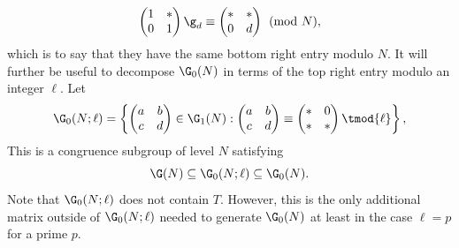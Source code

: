 \documentclass[12pt]{article}
\begin{document}
        \[
          \begin{pmatrix} 1 & \ast \\ 0 & 1 \end{pmatrix}\g_{d} \equiv \begin{pmatrix} \ast & \ast \\ 0 & d \end{pmatrix} \pmod{N},
        \]
        which is to say that they have the same bottom right entry modulo \(N\). It will further be useful to decompose \(\G_{0}(N)\) in terms of the top right entry modulo an integer \(\ell\). Let
        \[
          \G_{0}(N;\ell) = \left\{\begin{pmatrix} a & b \\ c & d \end{pmatrix} \in \G_{1}(N):\begin{pmatrix} a & b \\ c & d \end{pmatrix} \equiv \begin{pmatrix} \ast & 0 \\ \ast & \ast \end{pmatrix} \tmod{\ell}\right\},
        \]
        This is a congruence subgroup of level \(N\) satisfying
        \[
          \G(N) \subseteq \G_{0}(N;\ell) \subseteq \G_{0}(N).
        \]
        Note that \(\G_{0}(N;\ell)\) does not contain \(T\). However, this is the only additional matrix outside of \(\G_{0}(N;\ell)\) needed to generate \(\G_{0}(N)\) at least in the case \(\ell = p\) for a prime \(p\).
\end{document}
